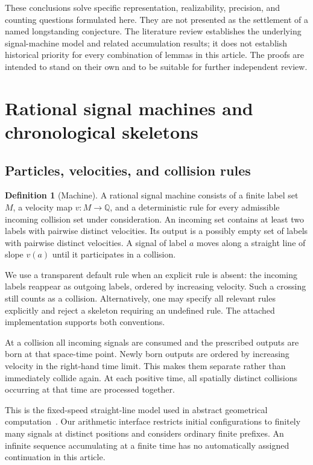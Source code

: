 \documentclass[11pt,letterpaper]{article}
\numberwithin{equation}{section}
\theoremstyle{definition}
\newtheorem{definition}[theorem]{Definition}
\theoremstyle{remark}
\newcommand{\Q}{\mathbb Q}
\begin{document}
These conclusions solve specific representation, realizability, precision,
and counting questions formulated here. They are not presented as the
settlement of a named longstanding conjecture. The literature review
establishes the underlying signal-machine model and related accumulation
results; it does not establish historical priority for every combination of
lemmas in this article. The proofs are intended to stand on their own and
to be suitable for further independent review.

\section{Rational signal machines and chronological skeletons}
\label{smc:cg:sec:model}

\subsection{Particles, velocities, and collision rules}

\begin{definition}[Machine]
A rational signal machine consists of a finite label set $M$, a velocity map
$v:M\to\Q$, and a deterministic rule for every admissible incoming collision
set under consideration. An incoming set contains at least two labels with
pairwise distinct velocities. Its output is a possibly empty set of labels
with pairwise distinct velocities. A signal of label $a$ moves along a
straight line of slope $v(a)$ until it participates in a collision.
\end{definition}

We use a transparent default rule when an explicit rule is absent: the
incoming labels reappear as outgoing labels, ordered by increasing velocity.
Such a crossing still counts as a collision. Alternatively, one may specify
all relevant rules explicitly and reject a skeleton requiring an undefined
rule. The attached implementation supports both conventions.

At a collision all incoming signals are consumed and the prescribed outputs
are born at that space-time point. Newly born outputs are ordered by
increasing velocity in the right-hand time limit. This makes them separate
rather than immediately collide again. At each positive time, all spatially
distinct collisions occurring at that time are processed together.

This is the fixed-speed straight-line model used in abstract geometrical
computation~\cite{durandlose}. Our arithmetic interface restricts initial
configurations to finitely many signals at distinct positions and considers
ordinary finite prefixes. An infinite sequence accumulating at a finite time
has no automatically assigned continuation in this article.
\end{document}
